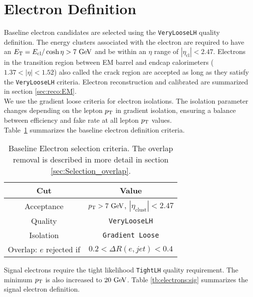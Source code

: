 \section{Electron Definition}  \label{sec:EleDef}

\indent Baseline electron candidates are selected using the {\tt VeryLooseLH} quality definition. The energy clusters associated with the electron are required to have an $\et = E_{\mathrm{cl}} / \cosh{\eta} > 7 \gev$ and be within an $\eta$ range of $|\eta_{\mathrm{cl}}| < 2.47$. Electrons in the transition region between EM barrel and endcap calorimeters ($1.37 < |\eta| < 1.52$) also called the crack region are accepted as long as they satisfy the {\tt VeryLooseLH} criteria. Electron reconstruction and calibrated are summarized in section \ref{sec:reco:EM}.\\

\indent We use the gradient loose criteria for electron isolations. The isolation parameter changes depending on the lepton $p_{\mathrm{T}}$ in gradient isolation, ensuring a balance between efficiency and fake rate at all lepton $p_{\mathrm{T}}$ values. \\

\indent Table~\ref{tb:electrons:baseline} summarizes the baseline electron definition criteria.   


\begin{table}[htp]
  \begin{center}
    \begin{tabular}{c|c} \hline \hline
      Cut & Value \\ \hline \hline
      Acceptance & $\pT > 7 \gev$, $|\eta_{\mathrm{clust}}| < 2.47$ \\ \hline
      Quality & {\tt VeryLooseLH} \\ \hline
      Isolation & {\tt Gradient Loose} \\ \hline
      Overlap: $e$ rejected if &  $0.2 < \Delta R(e,jet) < 0.4$\\ \hline%
      \hline
    \end{tabular}
  \caption{Baseline Electron selection criteria. The overlap removal is described in more detail in section \ref{sec:Selection_overlap}.}
  \end{center}
  \label{tb:electrons:baseline}
\end{table}%

\indent Signal electrons require the tight likelihood {\tt TightLH} quality requirement.  The minimum $p_{\mathrm{T}}$ is also increased to $20 \gev$.  Table \ref{tb:electrons:sig} summarizes the signal electron definition. \\

